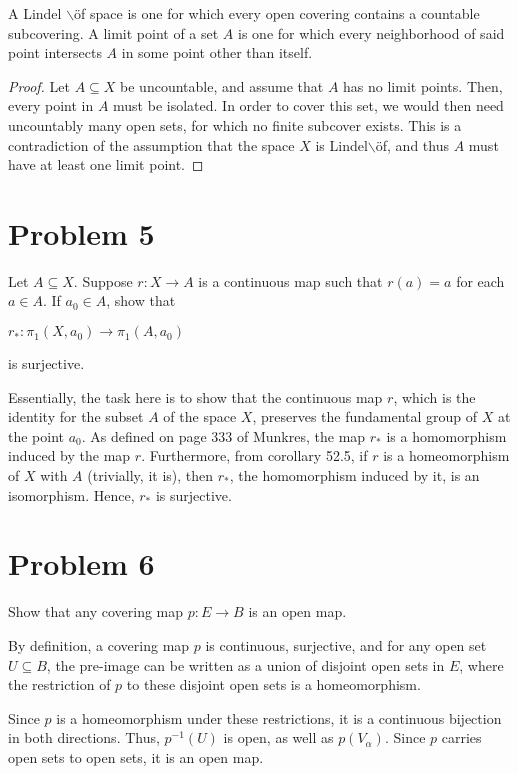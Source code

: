 \documentclass[11pt]{article}
\begin{document}
A Lindel $\backslash$\"of space is one for which every open covering contains a countable
subcovering. A limit point of a set \(A\) is one for which every neighborhood of
said point intersects \(A\) in some point other than itself. 

\begin{proof}
Let \(A\subseteq X\) be uncountable, and assume that \(A\) has no limit points.
Then, every point in \(A\) must be isolated. In order to cover this set, we would
then need uncountably many open sets, for which no finite subcover exists. This
is a contradiction of the assumption that the space \(X\) is Lindel$\backslash$\"of, and thus
\(A\) must have at least one limit point. 
\end{proof}

\section{Problem 5}
\label{sec:org7465c66}

Let \(A\subseteq X\). Suppose \(r: X\rightarrow A\) is a continuous map such that
\(r(a) = a\) for each \(a\in A\). If \(a_0 \in A\), show that

\(r_*: \pi_1(X, a_0)\rightarrow \pi_1(A, a_0)\)

is surjective.

Essentially, the task here is to show that the continuous map \(r\), which is the
identity for the subset \(A\) of the space \(X\), preserves the fundamental group of
\(X\) at the point \(a_0\). As defined on page 333 of Munkres, the map \(r_*\) is a
homomorphism induced by the map \(r\). Furthermore, from corollary 52.5, if \(r\)
is a homeomorphism of \(X\) with \(A\) (trivially, it is), then \(r_*\), the
homomorphism induced by it, is an isomorphism. Hence, \(r_*\) is surjective.   

\section{Problem 6}
\label{sec:orgc2c198d}

Show that any covering map \(p: E\rightarrow B\) is an open map.

By definition, a covering map \(p\) is continuous, surjective, and for any open
set \(U \subseteq B\), the pre-image can be written as a union of disjoint open
sets in \(E\), where the restriction of \(p\) to these disjoint open sets is a
homeomorphism. 

Since \(p\) is a homeomorphism under these restrictions, it is a continuous
bijection in both directions. Thus, \(p^{-1}(U)\) is open, as well as
\(p(V_{\alpha})\). Since \(p\) carries open sets to open sets, it is an open map. 
\end{document}
